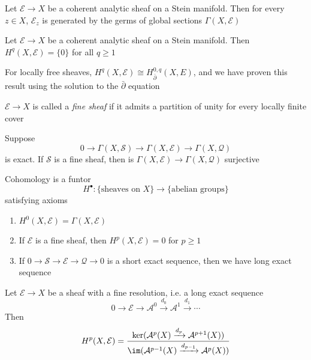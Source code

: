 \documentclass[../main.tex]{subfiles}
\begin{document}
\begin{theorem}
Let $\mathcal E\to X$ be a coherent analytic sheaf on a Stein manifold. Then for every $z\in X$, $\mathcal E_z$ is generated by the germs of global sections $\Gamma(X,\mathcal E)$
\end{theorem}

\begin{theorem}
Let $\mathcal E\to X$ be a coherent analytic sheaf on a Stein manifold. Then $H^q(X,\mathcal E)=\{0\}$ for all $q\geq1$
\end{theorem}

\begin{remark}
For locally free sheaves, $H^q(X,\mathcal E)\cong H^{0,q}_{\bar\partial}(X,E)$, and we have proven this result using the solution to the $\bar\partial$ equation
\end{remark}

\begin{definition}
$\mathcal E\to X$ is called a \textit{fine sheaf} if it admits a partition of unity for every locally finite cover
\end{definition}

\begin{proposition}
Suppose
\[0\to\Gamma(X,\mathcal S)\to\Gamma(X,\mathcal E)\to\Gamma(X,\mathcal Q)\]
is exact. If $\mathcal S$ is a fine sheaf, then is $\Gamma(X,\mathcal E)\to\Gamma(X,\mathcal Q)$ surjective
\end{proposition}

\begin{definition}
Cohomology is a funtor
\[H^\bullet:\{\text{sheaves on }X\}\to\{\text{abelian groups}\}\]
satisfying axioms
\begin{enumerate}
\item $H^0(X,\mathcal E)=\Gamma(X,\mathcal E)$
\item If $\mathcal E$ is a fine sheaf, then $H^p(X,\mathcal E)=0$ for $p\geq1$
\item If $0\to\mathcal S\to\mathcal E\to\mathcal Q\to0$ is a short exact sequence, then we have long exact sequence
\end{enumerate}
\end{definition}

\begin{proposition}
Let $\mathcal E\to X$ be a sheaf with a fine resolution, i.e. a long exact sequence
\[0\to\mathcal E\to\mathcal A^0\xrightarrow{d_0}\mathcal A^1\xrightarrow{d_1}\cdots\]
Then
\[H^p(X,\mathcal E)=\frac{\ker(\mathcal A^p(X)\xrightarrow{d_p}\mathcal A^{p+1}(X))}{\im(\mathcal A^{p-1}(X)\xrightarrow{d_{p-1}}\mathcal A^{p}(X))}\]
\end{proposition}
\end{document}
